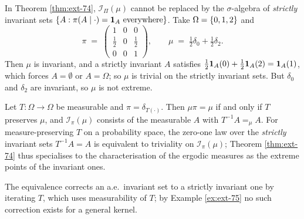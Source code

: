 \begin{example}
    \label{ex:ext-75}
    \leanok

    In Theorem \ref{thm:ext-74}, $\mathcal I_\Pi(\mu)$ cannot be replaced by the $\sigma$-algebra of
    \emph{strictly} invariant sets $\left\{ A : \pi(A \mid \cdot) = \mathbf{1}_A \text{ everywhere} \right\}$. Take
    $\Omega = \left\{ 0,1,2 \right\}$ and
    \[\pi \;=\; \begin{pmatrix} 1 & 0 & 0 \\ \tfrac12 & 0 & \tfrac12 \\ 0 & 0 & 1\end{pmatrix},
      \qquad \mu \;=\; \tfrac12\delta_0 + \tfrac12\delta_2 .\]
    Then $\mu$ is invariant, and a strictly invariant $A$ satisfies
    $\tfrac12\mathbf{1}_A(0) + \tfrac12\mathbf{1}_A(2) = \mathbf{1}_A(1)$, which forces $A = \emptyset$ or $A = \Omega$;
    so $\mu$ is trivial on the strictly invariant sets. But $\delta_0$ and $\delta_2$ are
    invariant, so $\mu$ is not extreme.
\end{example}

\begin{proposition}
    \label{prop:ext-mathlib}
    \leanok

    Let $T : \Omega \to \Omega$ be measurable and $\pi = \delta_{T(\cdot)}$. Then $\mu\pi = \mu$
    if and only if $T$ preserves $\mu$, and $\mathcal I_\pi(\mu)$ consists of the measurable $A$
    with $T^{-1}A =_\mu A$. For measure-preserving $T$ on a probability space, the zero-one law over
    the \emph{strictly} invariant sets $T^{-1}A = A$ is equivalent to triviality on
    $\mathcal I_\pi(\mu)$; Theorem \ref{thm:ext-74} thus specialises to the characterisation of the
    ergodic measures as the extreme points of the invariant ones.

    The equivalence corrects an a.e.\ invariant set to a strictly invariant one by iterating $T$,
    which uses measurability of $T$; by Example \ref{ex:ext-75} no such correction exists for a
    general kernel.
\end{proposition}

